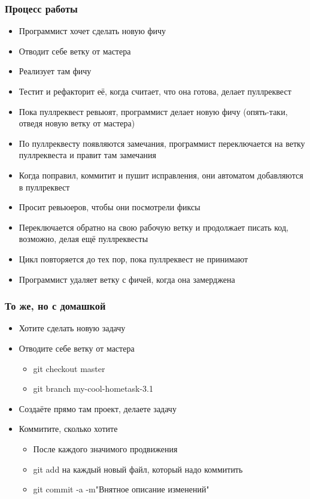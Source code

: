 \documentclass[xetex,mathserif,serif]{beamer}
\begin{document}
	\begin{frame}
		\frametitle{Процесс работы}
		\begin{footnotesize}
			\begin{itemize}
				\item Программист хочет сделать новую фичу
				\item Отводит себе ветку от мастера
				\item Реализует там фичу
				\item Тестит и рефакторит её, когда считает, что она готова, делает пуллреквест
				\item Пока пуллреквест ревьюят, программист делает новую фичу (опять-таки, отведя новую ветку от мастера)
				\item По пуллреквесту появляются замечания, программист переключается на ветку пуллреквеста и правит там замечания
				\item Когда поправил, коммитит и пушит исправления, они автоматом добавляются в пуллреквест
				\item Просит ревьюеров, чтобы они посмотрели фиксы
				\item Переключается обратно на свою рабочую ветку и продолжает писать код, возможно, делая ещё пуллреквесты 
				\item Цикл повторяется до тех пор, пока пуллреквест не принимают
				\item Программист удаляет ветку с фичей, когда она замерджена
			\end{itemize}
		\end{footnotesize}
	\end{frame}

	\begin{frame}
		\frametitle{То же, но с домашкой}
		\begin{itemize}
			\item Хотите сделать новую задачу
			\item Отводите себе ветку от мастера
			\begin{itemize}
				\item git checkout master
				\item git branch my-cool-hometask-3.1
			\end{itemize}
			\item Создаёте прямо там проект, делаете задачу
			\item Коммитите, сколько хотите
			\begin{itemize}
				\item После каждого значимого продвижения
				\item git add на каждый новый файл, который надо коммитить
				\item git commit -a -m"Внятное описание изменений"
			\end{itemize}
		\end{itemize}
	\end{frame}
\end{document}
